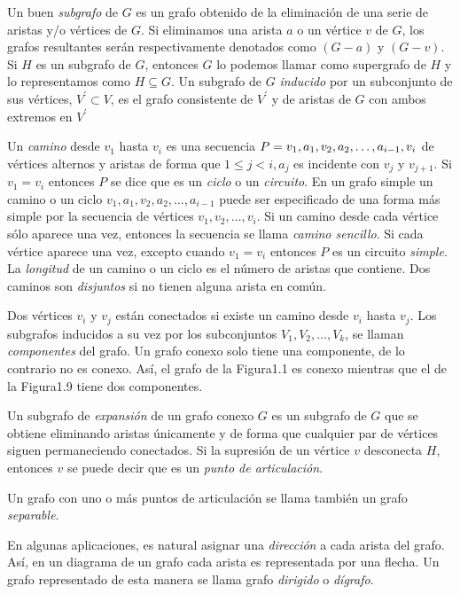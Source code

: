 \documentclass[10pt,a5paper]{book}
\begin{document}
Un buen \emph{subgrafo} de $G$ es un grafo obtenido de la eliminación de una serie de aristas y/o vértices de $G$. Si eliminamos una arista $a$ o un vértice $v$ de $G$, los grafos resultantes serán respectivamente denotados como $(G-a)$ y $(G-v)$. Si $H$ es un subgrafo de $G$, entonces $G$ lo podemos llamar como supergrafo de $H$ y lo representamos como $H \subseteq G$. Un subgrafo de $G$ \emph{inducido} por un subconjunto de sus vértices, $V^{'} \subset V$, es el grafo consistente de $V^{'}$ y de aristas de $G$ con ambos extremos en $V^{'}$

Un \emph{camino} desde $v_1$ hasta $v_i$ es una secuencia $P = v_1,a_1,v_2,\\a_2, \ldots,a_{i-1},v_i$ de vértices alternos y aristas de forma que $1 \le j < i, a_j$ es incidente con $v_j$ y $v_{j+1}$. Si $v_1 = v_i$ entonces $P$ se dice que es un \emph{ciclo} o un \emph{circuito}. En un grafo simple un camino o un ciclo $v_1,a_1,v_2,a_2, \ldots,a_{i-1}$ puede ser especificado de una forma más simple por la secuencia de vértices $v_1,v_2, \ldots,v_i$. Si un camino desde cada vértice sólo aparece una vez, entonces la secuencia se llama \emph{camino sencillo}. Si cada vértice aparece una vez, excepto cuando $v_1 = v_i$ entonces $P$ es un circuito \emph{simple}. La \emph{longitud} de un camino o un ciclo es el número de aristas que contiene. Dos caminos son \emph{disjuntos} si no tienen alguna arista en común.

Dos vértices $v_i$ y $v_j$ están conectados si existe un camino desde $v_i$ hasta $v_j$. Los subgrafos inducidos a su vez por los subconjuntos $V_1,V_2, \ldots,V_k$, se llaman \emph{componentes} del grafo. Un grafo conexo solo tiene una componente, de lo contrario no es conexo. Así, el grafo de la Figura1.1 es conexo mientras que el de la Figura1.9 tiene dos componentes.

Un subgrafo de \emph{expansión} de un grafo conexo $G$ es un subgrafo de $G$ que se obtiene eliminando aristas únicamente y de forma que cualquier par de vértices siguen permaneciendo conectados. Si la supresión de un vértice $v$ desconecta $H$, entonces $v$ se puede decir que es un \emph{punto de articulación}.

Un grafo con uno o más puntos de articulación se llama también un grafo \emph{separable}.

En algunas aplicaciones, es natural asignar una \emph{dirección} a cada arista del grafo. Así, en un diagrama de un grafo cada arista es representada por una flecha. Un grafo representado de esta manera se llama grafo \emph{dirigido} o \emph{dígrafo}.\\
\end{document}
